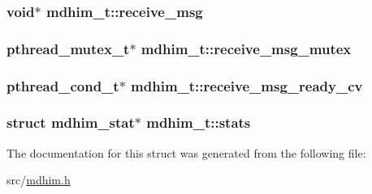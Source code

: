 \hypertarget{structmdhim__t_abc3233b7d61111d19bb7ac0222a918fc}{
\subsubsection[{receive\-\_\-msg}]{\setlength{\rightskip}{0pt plus 5cm}void$\ast$ mdhim\-\_\-t\-::receive\-\_\-msg}}\label{structmdhim__t_abc3233b7d61111d19bb7ac0222a918fc}
\hypertarget{structmdhim__t_ae5abe6f33b5951a30f582fda42292706}{
\subsubsection[{receive\-\_\-msg\-\_\-mutex}]{\setlength{\rightskip}{0pt plus 5cm}pthread\-\_\-mutex\-\_\-t$\ast$ mdhim\-\_\-t\-::receive\-\_\-msg\-\_\-mutex}}\label{structmdhim__t_ae5abe6f33b5951a30f582fda42292706}
\hypertarget{structmdhim__t_ac4a79eb13f34377840b924c41802f0fb}{
\subsubsection[{receive\-\_\-msg\-\_\-ready\-\_\-cv}]{\setlength{\rightskip}{0pt plus 5cm}pthread\-\_\-cond\-\_\-t$\ast$ mdhim\-\_\-t\-::receive\-\_\-msg\-\_\-ready\-\_\-cv}}\label{structmdhim__t_ac4a79eb13f34377840b924c41802f0fb}
\hypertarget{structmdhim__t_a69e06bfc0fb536ac2759b3ebb4c8cca1}{
\subsubsection[{stats}]{\setlength{\rightskip}{0pt plus 5cm}struct {\bf mdhim\-\_\-stat}$\ast$ mdhim\-\_\-t\-::stats}}\label{structmdhim__t_a69e06bfc0fb536ac2759b3ebb4c8cca1}


The documentation for this struct was generated from the following file\-:\begin{DoxyCompactItemize}
\item 
src/\hyperlink{mdhim_8h}{mdhim.\-h}\end{DoxyCompactItemize}
